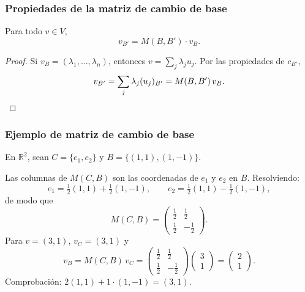 \begin{frame}
    \frametitle{Propiedades de la matriz de cambio de base}

    \begin{proposition}
        Para todo $v\in V$,
        \[
            v_{B'}=M(B,B')\cdot v_B.
        \]
    \end{proposition}

    \begin{proof}
        Si $v_B=(\lambda_1,\ldots,\lambda_n) $, entonces $v=\sum_j\lambda_j u_j$.
        Por las propiedades de $c_{B'}$,
        \[
            v_{B'}
            =\sum_j\lambda_j(u_j)_{B'}
            =M(B,B')\,v_B.\qedhere
        \]
    \end{proof}
\end{frame}


\begin{frame}
    \frametitle{Ejemplo de matriz de cambio de base}

    En $\mathbb{R}^2$, sean $C=\{e_1,e_2\}$ y $B=\{(1,1),(1,-1)\}$.

    Las columnas de $M(C,B)$ son las coordenadas de $e_1$ y $e_2$ en $B$.
    Resolviendo:
    \[
        e_1=\tfrac{1}{2}(1,1)+\tfrac{1}{2}(1,-1),
        \qquad
        e_2=\tfrac{1}{2}(1,1)-\tfrac{1}{2}(1,-1),
    \]
    de modo que
    \[
        M(C,B)=
        \begin{pmatrix}
            \tfrac{1}{2}&\tfrac{1}{2}\\[4pt]
            \tfrac{1}{2}&-\tfrac{1}{2}
        \end{pmatrix}.
    \]
    Para $v=(3,1)$, $v_C=(3,1) $ y
    \[
        v_B=M(C,B)\,v_C=
        \begin{pmatrix}
            \tfrac{1}{2}&\tfrac{1}{2}\\[4pt]
            \tfrac{1}{2}&-\tfrac{1}{2}
        \end{pmatrix}
        \begin{pmatrix}3\\1\end{pmatrix}
        =\begin{pmatrix}2\\1\end{pmatrix}.
    \]
    Comprobación: $2(1,1)+1\cdot(1,-1)=(3,1)$. \checkmark
\end{frame}



